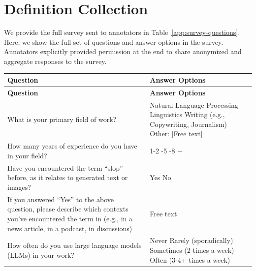 \documentclass{article} %
\begin{document}
\section{Definition Collection}
\label{app:defn}
We provide the full survey sent to annotators in  Table~\ref{app:survey-questions}. Here, we show the full set of questions and answer options in the survey. Annotators explicitly provided permission at the end to share anonymized and aggregate responses to the survey. 

\begin{table}[h]
\begin{longtable}{p{} p{}}
\toprule
\textbf{Question} & \textbf{Answer Options} \\
\midrule
\endfirsthead
\toprule
\textbf{Question} & \textbf{Answer Options} \\
\midrule
\endhead
\midrule
\endfoot
\bottomrule
\endlastfoot

What is your primary field of work? & Natural Language Processing \newline Linguistics \newline Writing (e.g., Copywriting, Journalism) \newline Other: [Free text] \\
\midrule

How many years of experience do you have in your field? & 1-2 \newline 3-5 \newline 5-8 \newline 9+ \\
\midrule

Have you encountered the term ``slop'' before, as it relates to generated text or images? & Yes \newline No \\
\midrule

If you answered ``Yes'' to the above question, please describe which contexts you've encountered the term in (e.g., in a news article, in a podcast, in discussions) & Free text \\
\midrule

How often do you use large language models (LLMs) in your work? & Never \newline Rarely (sporadically) \newline Sometimes (2 times a week) \newline Often (3-4+ times a week) \\
\midrule


\end{longtable}
\end{table}
\end{document}
